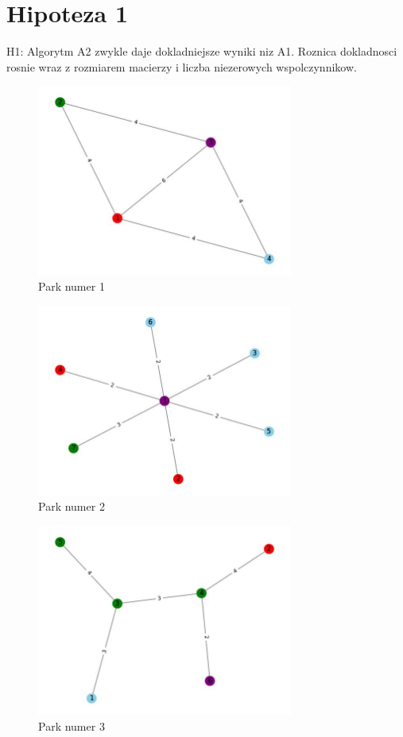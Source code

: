 \documentclass{article}
\begin{document}
\section{Hipoteza 1}
H1: Algorytm A2 zwykle daje dokladniejsze wyniki niz A1. Roznica dokladnosci rosnie wraz z rozmiarem macierzy i liczba niezerowych wspolczynnikow.
\begin{figure}[h!]
\centering
\includegraphics[width=0.75\textwidth]{1.jpg}
\caption{Park numer 1}
\end{figure}
\begin{figure}[h!]
\centering
\includegraphics[width=0.75\textwidth]{2.jpg}
\caption{Park numer 2}
\end{figure}
\begin{figure}[h!]
\centering
\includegraphics[width=0.75\textwidth]{3.jpg}
\caption{Park numer 3}
\end{figure}
\end{document}
